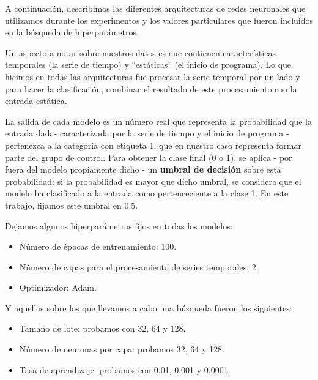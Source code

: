 \documentclass[../../main.tex]{subfiles}
\begin{document}
A continuación, describimos las diferentes arquitecturas de redes neuronales que
utilizamos durante los experimentos y los valores particulares que fueron incluidos en la
búsqueda de hiperparámetros.

Un aspecto a notar sobre nuestros datos es que contienen características temporales (la
serie de tiempo) y ``estáticas'' (el inicio de programa). Lo que hicimos en todas las
arquitecturas fue procesar la serie temporal por un lado y para hacer la clasificación,
combinar el resultado de este procesamiento con la entrada estática.

La salida de cada modelo es un número real que representa la probabilidad que la entrada
dada\footnotemark - caracterizada por la serie de tiempo y el inicio de programa -
pertenezca a la categoría con etiqueta 1, que en nuestro caso representa formar parte del
grupo de control. Para obtener la clase final (0 o 1), se aplica - por fuera del modelo
propiamente dicho - un \textbf{umbral de decisión} sobre esta probabilidad: si la
probabilidad es mayor que dicho umbral, se considera que el modelo ha clasificado a la
entrada como pertenceciente a la clase 1. En este trabajo, fijamos este umbral en 0.5.

Dejamos algunos hiperparámetros fijos en todas los modelos:
\begin{itemize}[itemsep=0cm, topsep=0cm, parsep=0cm, partopsep=0cm]
    \item Número de épocas de entrenamiento: 100.
    \item Número de capas para el procesamiento de series temporales: 2.
    \item Optimizador: Adam.
\end{itemize}

Y aquellos sobre los que llevamos a cabo una búsqueda fueron los siguientes:
\begin{itemize}[itemsep=0cm, topsep=0cm, parsep=0cm, partopsep=0cm]
    \item Tamaño de lote: probamos con 32, 64 y 128.
    \item Número de neuronas por capa: probamos 32, 64 y 128.
    \item Tasa de aprendizaje: probamos con 0.01, 0.001 y 0.0001.
\end{itemize}
\end{document}
